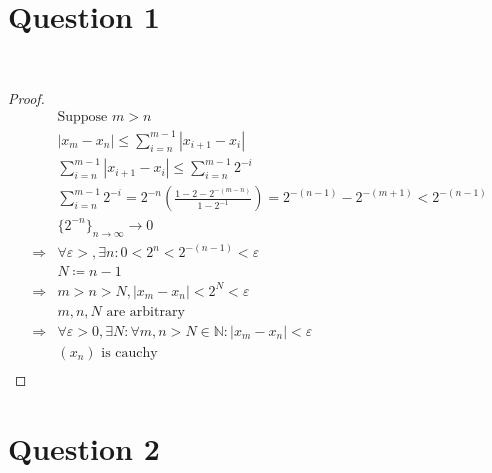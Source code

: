 \documentclass{article}
\begin{document}
\section*{Question 1}

~

\begin{proof}
    \begin{align*}
        &\text{Suppose }m>n\\
        &\left|x_{m}-x_{n}\right|\leqslant \sum_{i=n}^{m-1}|x_{i+1}-x_i|\\
        &\sum_{i=n}^{m-1}\left|x_{i+1}-x_i\right|\leqslant\sum_{i=n}^{m-1}2^{-i}\\
        &\sum_{i=n}^{m-1}2^{-i}=2^{-n}\left(\frac{1-2-2^{-(m-n)}}{1-2^{-1}}\right)=2^{-(n-1)}-2^{-(m+1)}<2^{-(n-1)}\\
        &\{2^{-n}\}_{n\to\infty}\to0\\
        \Rightarrow&\forall \varepsilon>,\exists n:0<2^{n}<2^{-(n-1)}<\varepsilon\\
        &N\coloneqq n-1\\
        \Rightarrow&m>n>N,\left|x_{m}-x_{n}\right|<2^{N}<\varepsilon\\
        &m,n,N\text{ are arbitrary}\\
        \Rightarrow&\forall \varepsilon>0,\exists N: \forall m,n>N\in \mathbb{N}:\left|x_{m}-x_{n}\right|<\varepsilon\\
        &(x_n)\text{ is cauchy}\\
    \end{align*}
\end{proof}

\newpage

\section*{Question 2}

~
\end{document}
